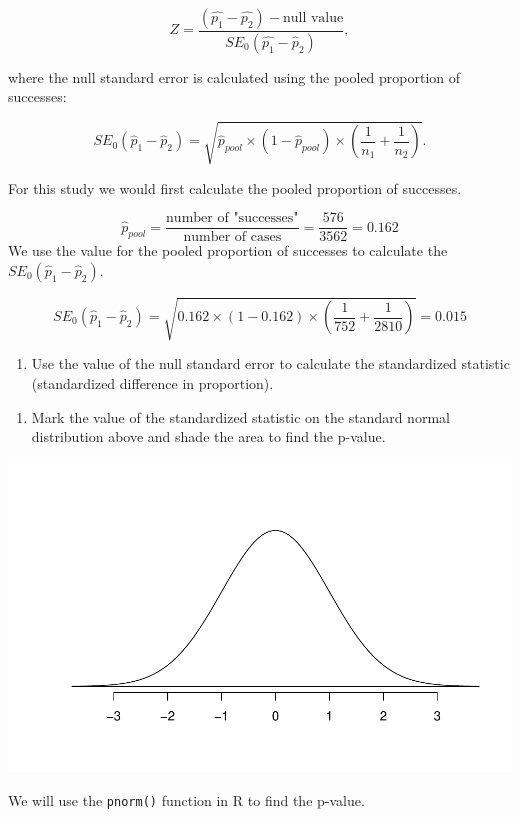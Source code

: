 \documentclass[
]{report}
\providecommand{\tightlist}{%
  \setlength{\itemsep}{0pt}\setlength{\parskip}{0pt}}
\begin{document}
\[
Z = \frac{(\hat{p_1} - \hat{p_2}) - \text{null value}}{SE_0(\hat{p_1}-\hat{p}_2)},
\]

where the null standard error is calculated using the pooled proportion of successes:

\[
SE_0(\hat{p}_1-\hat{p}_2)=\sqrt{\hat{p}_{pool}\times (1-\hat{p}_{pool})\times \left(\frac{1}{n_1}+\frac{1}{n_2}\right)}.
\]

For this study we would first calculate the pooled proportion of successes.

\[\hat{p}_{pool} = \frac{\text{number of "successes"}}{\text{number of cases}} = \frac{576}{3562} = 0.162\]
We use the value for the pooled proportion of successes to calculate the \(SE_0(\hat{p}_1 - \hat{p}_2)\).

\[
SE_0(\hat{p}_1-\hat{p}_2)=\sqrt{0.162 \times (1-0.162)\times \left(\frac{1}{752}+\frac{1}{2810}\right)} = 0.015
\]

\begin{enumerate}
\def\labelenumi{\arabic{enumi}.}
\setcounter{enumi}{6}
\tightlist
\item
  Use the value of the null standard error to calculate the standardized statistic (standardized difference in proportion).
\end{enumerate}

\vspace{0.8in}

\begin{enumerate}
\def\labelenumi{\arabic{enumi}.}
\setcounter{enumi}{7}
\tightlist
\item
  Mark the value of the standardized statistic on the standard normal distribution above and shade the area to find the p-value.
\end{enumerate}

\begin{center}\includegraphics[width=0.5\linewidth]{09-A08-inference-2cat_test-theory_files/figure-latex/simpleNormal-1} \end{center}

\newpage

We will use the \texttt{pnorm()} function in R to find the p-value.
\end{document}
